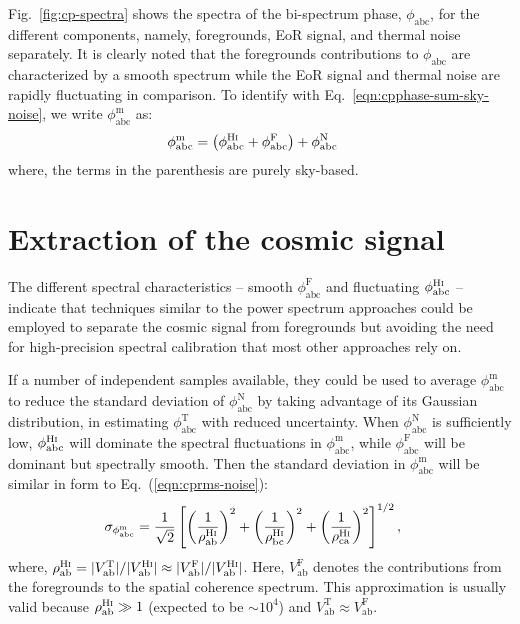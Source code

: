 \documentclass[
reprint,
superscriptaddress,
amsmath,
amssymb,
aps,
]{revtex4-1}
\begin{document}
Fig.~\ref{fig:cp-spectra} shows the spectra of the bi-spectrum phase, $\phi_\textrm{abc}$, for the different components, namely, foregrounds, EoR signal, and thermal noise separately. It is clearly noted that the foregrounds contributions to $\phi_\textrm{abc}$ are characterized by a smooth spectrum while the EoR signal and thermal noise are rapidly fluctuating in comparison. To identify with Eq.~\ref{eqn:cpphase-sum-sky-noise}, we write $\phi_\textrm{abc}^\textrm{m}$ as:
\begin{align}\label{eqn:cp-components}
  \phi_\textrm{abc}^\textrm{m} &= \left(\phi_\textrm{abc}^\textrm{H{\sc i}} + \phi_\textrm{abc}^\textrm{F}\right) + \phi_\textrm{abc}^\textrm{N}
\end{align}
where, the terms in the parenthesis are purely sky-based. 

\section{Extraction of the cosmic signal}\label{sec:extraction}

The different spectral characteristics -- smooth $\phi_\textrm{abc}^\textrm{F}$ and fluctuating $\phi_\textrm{abc}^\textrm{H{\sc i}}$ -- indicate that techniques similar to the power spectrum approaches could be employed to separate the cosmic signal from foregrounds but avoiding the need for high-precision spectral calibration that most other approaches rely on.

If a number of independent samples available, they could be used to average $\phi_\textrm{abc}^\textrm{m}$ to reduce the standard deviation of $\phi_\textrm{abc}^\textrm{N}$ by taking advantage of its Gaussian distribution, in estimating $\phi_\textrm{abc}^\textrm{T}$ with reduced uncertainty. When $\phi_\textrm{abc}^\textrm{N}$ is sufficiently low, $\phi_\textrm{abc}^\textrm{H{\sc i}}$ will dominate the spectral fluctuations in $\phi_\textrm{abc}^\textrm{m}$, while $\phi_\textrm{abc}^\textrm{F}$ will be dominant but spectrally smooth. Then the standard deviation in $\phi_\textrm{abc}^\textrm{m}$ will be similar in form to Eq.~(\ref{eqn:cprms-noise}):
\begin{align}
  \sigma_{\phi_\textrm{abc}^\textrm{m}} &= \frac{1}{\sqrt{2}}\left[\left(\frac{1}{\rho_\textrm{ab}^\textrm{H{\sc i}}}\right)^2 + \left(\frac{1}{\rho_\textrm{bc}^\textrm{H{\sc i}}}\right)^2 + \left(\frac{1}{\rho_\textrm{ca}^\textrm{H{\sc i}}}\right)^2\right]^{1/2}, \label{eqn:cprms-EoR}
\end{align}
where, $\rho_\textrm{ab}^\textrm{H{\sc i}} = |V_\textrm{ab}^\textrm{T}|/|V_\textrm{ab}^\textrm{H{\sc i}}| \approx |V_\textrm{ab}^\textrm{F}|/|V_\textrm{ab}^\textrm{H{\sc i}}|$. Here, $V_\textrm{ab}^\textrm{F}$ denotes the contributions from the foregrounds to the spatial coherence spectrum. This approximation is usually valid because $\rho_\textrm{ab}^\textrm{H{\sc i}} \gg 1$ (expected to be $\sim 10^4$) and $V_\textrm{ab}^\textrm{T} \approx V_\textrm{ab}^\textrm{F}$. 
\end{document}
